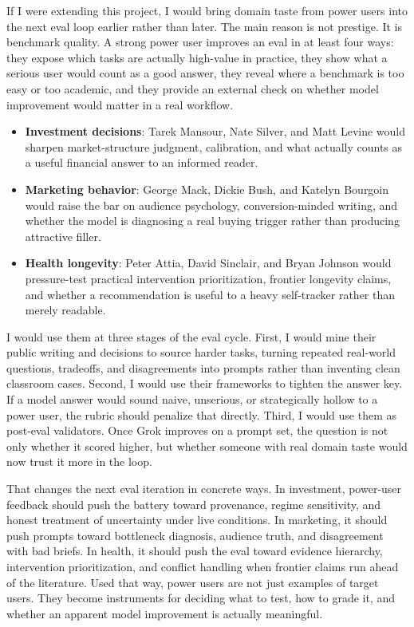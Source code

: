 \documentclass[11pt, a4paper]{article}
\begin{document}
If I were extending this project, I would bring domain taste from power users into the next eval loop earlier rather than later. The main reason is not prestige. It is benchmark quality. A strong power user improves an eval in at least four ways: they expose which tasks are actually high-value in practice, they show what a serious user would count as a good answer, they reveal where a benchmark is too easy or too academic, and they provide an external check on whether model improvement would matter in a real workflow.

\begin{itemize}[noitemsep]
    \item \textbf{Investment decisions}: Tarek Mansour, Nate Silver, and Matt Levine would sharpen market-structure judgment, calibration, and what actually counts as a useful financial answer to an informed reader.
    \item \textbf{Marketing behavior}: George Mack, Dickie Bush, and Katelyn Bourgoin would raise the bar on audience psychology, conversion-minded writing, and whether the model is diagnosing a real buying trigger rather than producing attractive filler.
    \item \textbf{Health longevity}: Peter Attia, David Sinclair, and Bryan Johnson would pressure-test practical intervention prioritization, frontier longevity claims, and whether a recommendation is useful to a heavy self-tracker rather than merely readable.
\end{itemize}

I would use them at three stages of the eval cycle. First, I would mine their public writing and decisions to source harder tasks, turning repeated real-world questions, tradeoffs, and disagreements into prompts rather than inventing clean classroom cases. Second, I would use their frameworks to tighten the answer key. If a model answer would sound naive, unserious, or strategically hollow to a power user, the rubric should penalize that directly. Third, I would use them as post-eval validators. Once Grok improves on a prompt set, the question is not only whether it scored higher, but whether someone with real domain taste would now trust it more in the loop.

That changes the next eval iteration in concrete ways. In investment, power-user feedback should push the battery toward provenance, regime sensitivity, and honest treatment of uncertainty under live conditions. In marketing, it should push prompts toward bottleneck diagnosis, audience truth, and disagreement with bad briefs. In health, it should push the eval toward evidence hierarchy, intervention prioritization, and conflict handling when frontier claims run ahead of the literature. Used that way, power users are not just examples of target users. They become instruments for deciding what to test, how to grade it, and whether an apparent model improvement is actually meaningful.
\end{document}
